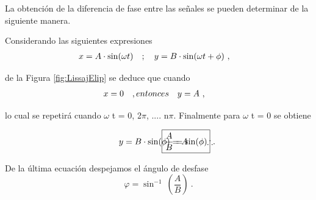       La obtención de la diferencia de fase entre las señales se pueden determinar de la
      siguiente manera.
      \newpage

      \noindent Considerando las siguientes expresiones
      \begin{align}
         x &= A\cdot \sin(\omega t) \hspace{10pt} ; \hspace{10pt} y = B\cdot \sin(\omega t + \phi) \ , \notag
      \end{align}
      
      \noindent de la Figura \ref{fig:LissajElip} se deduce que cuando
      \begin{align}
         x &= 0 \hspace{10pt} , entonces \hspace{10pt} y = A \ , \notag
      \end{align}   

      \noindent lo cual se repetirá cuando \(\omega\) t = 0, 2\(\pi\), .... n\(\pi\). Finalmente para 
      \( \omega \) t = 0 se obtiene

      \begin{align}
         \hspace{20pt} y &= B\cdot \sin(\phi) = A \hspace{20pt} \therefore \hspace{-70pt} \Aboxed{\dfrac{A}{B} = \sin(\phi)} \ . \notag 
      \end{align}
      
      \noindent De la última ecuación despejamos el ángulo de desfase
      \begin{equation}
         \boxed{\varphi = \sin^{-1}\ \left(\dfrac{A}{B} \right)}   \ . \label{eqn:AngDeDesf}   
      \end{equation}


